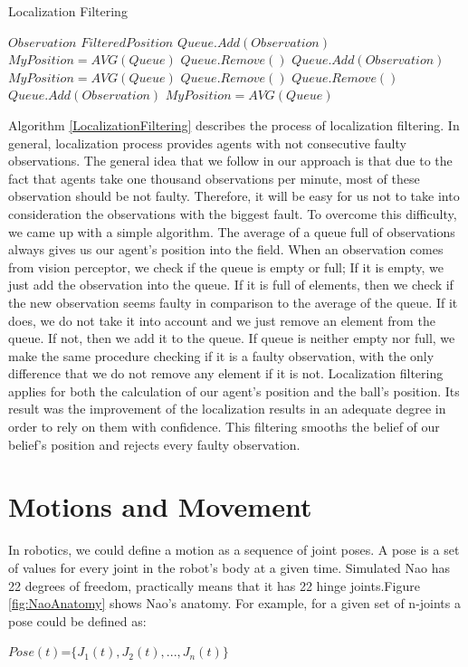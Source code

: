 \begin{algorithm}[ht!]
\caption{Localization Filtering}
\label{LocalizationFiltering}
\begin{algorithmic}[1]
$Observation$
$FilteredPosition$
\STATE $Queue.Add(Observation)$
\STATE $MyPosition = AVG(Queue)$
\STATE $Queue.Remove()$
\ELSE
\STATE $Queue.Add(Observation)$
\STATE $MyPosition = AVG(Queue)$
\ENDIF
\ELSE
{}
\STATE $Queue.Remove()$
\ELSE
\STATE $Queue.Remove()$
\STATE $Queue.Add(Observation)$
\STATE $MyPosition = AVG(Queue)$
\ENDIF
\ENDIF
\end{algorithmic}
\end{algorithm}
Algorithm \ref{LocalizationFiltering} describes the process of localization filtering. In general, localization process provides agents with not consecutive faulty observations. The general idea that we follow in our approach is that due to the fact that agents take one thousand observations per minute, most of these observation should be not faulty. Therefore, it will be easy for us not to take into consideration the observations with the biggest fault. To overcome this difficulty, we came up with a simple algorithm. The average of a queue full of observations always gives us our agent's position into the field. When an observation comes from vision perceptor, we check if the queue is empty or full; If it is empty, we just add the observation into the queue. If it is full of elements, then we check if the new observation seems faulty in comparison to the average of the queue. If it does, we do not take it into account and we just remove an element from the queue. If not, then we add it to the queue.
If queue is neither empty nor full, we make the same procedure checking if it is a faulty observation, with the only difference that we do not remove any element if it is not. Localization filtering applies for both the calculation of our agent's position and the ball's position. Its result was the improvement of the localization results in an adequate degree in order to rely on them with confidence. This filtering smooths the belief of our belief's position and rejects every faulty observation.





\section{Motions and Movement}
\label{Motions}
In robotics, we could define a motion as a sequence of joint poses. A pose is a set of values for every joint in the robot's body at a given time. Simulated Nao has 22 degrees of freedom, practically means that it has 22 hinge joints.Figure \ref{fig:NaoAnatomy} shows Nao's anatomy.
For example, for a given set of n-joints a pose could be defined as:\\
\begin{center}
$Pose(t)$=$\lbrace J_{1}(t),J_{2}(t),...,J_{n}(t) \rbrace$\\
\end{center}



